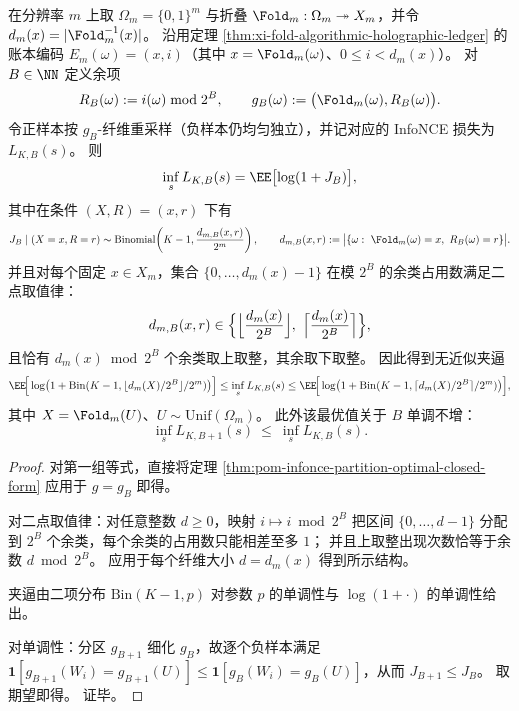 \begin{corollary}\label{cor:pom-infonce-fold-ledger-remainder-bits}
在分辨率 \(m\) 上取 \(\Omega_m=\{0,1\}^m\) 与折叠 \(\Fold_m:\Omega_m\twoheadrightarrow X_m\)，并令 \(d_m(x)=|\Fold_m^{-1}(x)|\)。
沿用定理 \ref{thm:xi-fold-algorithmic-holographic-ledger} 的账本编码 \(E_m(\omega)=(x,i)\)（其中 \(x=\Fold_m(\omega)\)、\(0\le i<d_m(x)\)）。
对 \(B\in\NN\) 定义余项
\[
R_B(\omega):= i(\omega)\bmod 2^B,
\qquad
g_B(\omega):=\bigl(\Fold_m(\omega),R_B(\omega)\bigr).
\]
令正样本按 \(g_B\)-纤维重采样（负样本仍均匀独立），并记对应的 InfoNCE 损失为 \(L_{K,B}(s)\)。
则
\[
\inf_s L_{K,B}(s)=\EE\bigl[\log(1+J_B)\bigr],
\]
其中在条件 \((X,R)=(x,r)\) 下有
\[
J_B\mid(X=x,R=r)\sim \mathrm{Binomial}\!\left(K-1,\frac{d_{m,B}(x,r)}{2^m}\right),
\qquad
d_{m,B}(x,r):=\bigl|\{\omega:\ \Fold_m(\omega)=x,\ R_B(\omega)=r\}\bigr|.
\]
并且对每个固定 \(x\in X_m\)，集合 \(\{0,\dots,d_m(x)-1\}\) 在模 \(2^B\) 的余类占用数满足二点取值律：
\[
d_{m,B}(x,r)\in\Bigl\{\Big\lfloor\frac{d_m(x)}{2^B}\Big\rfloor,\ \Big\lceil\frac{d_m(x)}{2^B}\Big\rceil\Bigr\},
\]
且恰有 \(d_m(x)\bmod 2^B\) 个余类取上取整，其余取下取整。
因此得到无近似夹逼
\[
\EE\!\Big[\log\bigl(1+\mathrm{Bin}(K-1,\lfloor d_m(X)/2^B\rfloor/2^m)\bigr)\Big]
\le
\inf_s L_{K,B}(s)
\le
\EE\!\Big[\log\bigl(1+\mathrm{Bin}(K-1,\lceil d_m(X)/2^B\rceil/2^m)\bigr)\Big],
\]
其中 \(X=\Fold_m(U)\)、\(U\sim\mathrm{Unif}(\Omega_m)\)。
此外该最优值关于 \(B\) 单调不增：
\[
\inf_s L_{K,B+1}(s)\ \le\ \inf_s L_{K,B}(s).
\]
\end{corollary}
\begin{proof}
对第一组等式，直接将定理 \ref{thm:pom-infonce-partition-optimal-closed-form} 应用于 \(g=g_B\) 即得。
\par
对二点取值律：对任意整数 \(d\ge 0\)，映射 \(i\mapsto i\bmod 2^B\) 把区间 \(\{0,\dots,d-1\}\) 分配到 \(2^B\) 个余类，每个余类的占用数只能相差至多 \(1\)；
并且上取整出现次数恰等于余数 \(d\bmod 2^B\)。
应用于每个纤维大小 \(d=d_m(x)\) 得到所示结构。
\par
夹逼由二项分布 \(\mathrm{Bin}(K-1,p)\) 对参数 \(p\) 的单调性与 \(\log(1+\cdot)\) 的单调性给出。
\par
对单调性：分区 \(g_{B+1}\) 细化 \(g_B\)，故逐个负样本满足
\(
\mathbf 1[g_{B+1}(W_i)=g_{B+1}(U)]\le \mathbf 1[g_B(W_i)=g_B(U)]
\)，从而 \(J_{B+1}\le J_B\)。
取期望即得。
证毕。
\end{proof}



